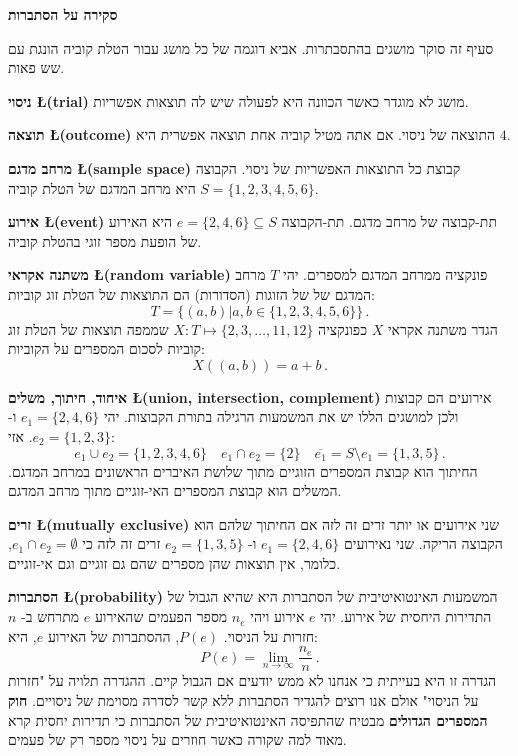 

\newpage

\begin{center}
\textbf{\LARGE סקירה על הסתברות}
\end{center}

סעיף זה סוקר מושגים בהתסבתרות. אביא דוגמה של כל מושג עבור הטלת קוביה הונגת עם שש פאות. 

\textbf{ניסוי \L{\small (trial)}}
מושג לא מוגדר כאשר הכוונה היא לפעולה שיש לה תוצאות אפשריות.

\textbf{תוצאה \L{\small (outcome)}} 
התוצאה של ניסוי. אם אתה מטיל קוביה אחת תוצאה אפשרית היא 
$4$.

\textbf{מרחב מדגם \L{\small (sample space)}}
קבוצת כל התוצאות האפשריות של ניסוי. הקבוצה 
$S=\{1,2,3,4,5,6\}$
היא מרחב המדגם של הטלת קוביה.

\textbf{אירוע \L{\small (event)}}
תת-קבוצה של מרחב מדגם. תת-הקבוצה 
$e=\{2,4,6\}\subseteq S$
היא האירוע של הופעת מספר זוגי בהטלת קוביה.

\textbf{משתנה אקראי \L{\small (random variable)}}
פונקציה ממרחב המדגם למספרים. יהי 
$T$
מרחב המדגם של של הזוגות (הסדורות) הם התוצאות של הטלת זוג קוביות:
\[
T=\{(a,b)| a,b\in \{1,2,3,4,5,6\} \}\,.
\]
הגדר משתנה אקראי 
$X$
כפונקציה
$X:T \mapsto \{2,3,\ldots,11,12\}$
שממפה תוצאות של הטלת זוג קוביות לסכום המספרים על הקוביות:
\begin{equation}\label{eq.sum}
X((a,b)) = a+b\,.
\end{equation}

\textbf{איחוד, חיתוך, משלים \L{\small (union, intersection, complement)}} 
אירועים הם קבוצות ולכן למושגים הללו יש את המשמעות הרגילה בתורת הקבוצות. יהי
$e_1=\{2,4,6\}$
ו-%
$e_2=\{1,2,3\}$. 
אזי:
\[
e_1 \cup e_2=\{1,2,3,4,6\}\quad e_1 \cap e_2=\{2\}\quad \overline{e_1} = S\setminus e_1=\{1,3,5\}\,.
\]
החיתוך הוא קבוצת המספרים הזוגיים מתוך שלושת האיברים הראשונים במרחב המדגם. המשלים הוא קבוצת המספרים האי-זוגיים מתוך מרחב המדגם.

\textbf{זרים \L{\small (mutually exclusive)}} 
שני אירועים או יותר זרים זה לזה אם החיתוך שלהם הוא הקבוצה הריקה. שני נאירועים
$e_1=\{2,4,6\}$
ו-%
$e_2=\{1,3,5\}$
זרים זה לזה כי
$e_1 \cap e_2=\emptyset$,
כלומר, אין תוצאות שהן מספרים שהם גם זוגיים וגם אי-זוגיים.

\textbf{הסתברות \L{\small (probability)}}
המשמעות האינטואיטיבית של הסתברות היא שהיא הגבול של התדירות היחסית של אירוע. יהי
$e$ 
אירוע ויהי
$n_e$
מספר הפעמים שהאירוע 
$e$
מתרחש ב-%
$n$
חזרות על הניסוי. 
$P(e)$,
ההסתברות של האירוע
$e$,
היא:
\[
P(e) = \lim_{n\rightarrow \infty} \frac{n_e}{n}\,.
\]
הגדרה זו היא בעייתית כי אנחנו לא ממש יודעים אם הגבול קיים. ההגדרה תלויה על "חזרות על הניסוי" אולם אנו רוצים להגדיר הסתברות ללא קשר לסדרה מסוימת של ניסויים. 
\textbf{חוק המספרים הגדולים}
מבטיח שהתפיסה האינטואיטיבית של הסתברות כי תדירות יחסית קרא מאוד למה שקורה כאשר חוזרים על ניסוי מספר רק של פעמים.

